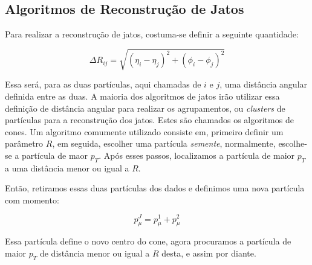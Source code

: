 \subsection{Algoritmos de Reconstrução de Jatos}

Para realizar a reconstrução de jatos\cite{salam_towards_2010}, costuma-se definir a seguinte quantidade:

\begin{equation}
 \Delta R_{ij} = \sqrt{(\eta_i-\eta_j)^2+(\phi_i-\phi_j)^2}
\end{equation}

Essa será, para as duas partículas, aqui chamadas de $i$ e $j$, uma distância angular
definida entre as duas. A maioria dos algoritmos de jatos irão utilizar essa definição de distância angular para realizar os agrupamentos,
ou {\it clusters} de partículas para a reconstrução dos jatos. Estes são chamados os algoritmos de cones. Um algoritmo
comumente utilizado consiste em, primeiro definir um parâmetro $R$, em seguida, escolher uma partícula {\it semente}, normalmente, escolhe-se
a partícula de maor $p_T$. Após esses passos, localizamos a partícula de maior $p_T$ a uma distância menor ou igual a $R$.
\par
Então, retiramos essas duas partículas dos dados e definimos uma nova partícula com momento:

\begin{equation}
 p_{\mu}^{J} = p_{\mu}^1 + p_{\mu}^2
\end{equation}

Essa partícula define o novo centro do cone, agora procuramos a partícula de maior $p_T$ de distância menor ou igual a $R$ desta, e assim por
diante.
